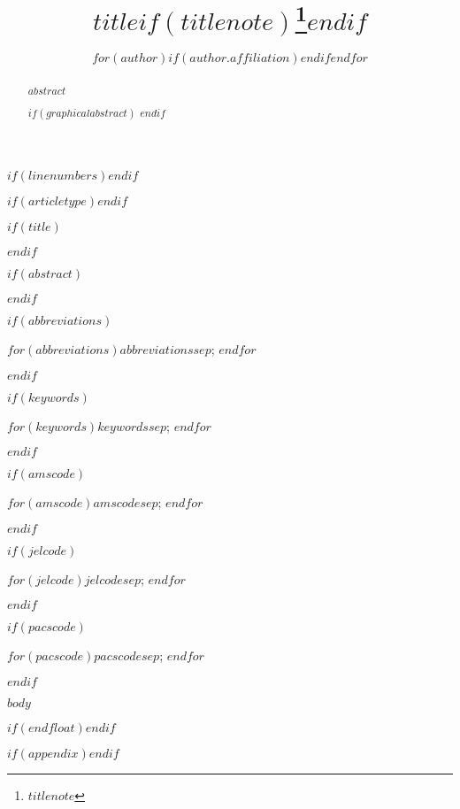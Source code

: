 \documentclass[$for(classoption)$$classoption$$sep$,$endfor$]{$documentclass$}
\theoremstyle{plain}
\theoremstyle{definition}
\theoremstyle{remark}
\begin{document}
$if(linenumbers)$\linenumbers$endif$

$if(articletype)$$endif$

$if(title)$
\title{$title$$if(titlenote)$\thanks{$titlenote$}$endif$}
$endif$

\author{%
$for(author)$$if(author.affiliation)$$endif$$endfor$
}

\maketitle

$if(abstract)$
\begin{abstract}
$abstract$

$if(graphicalabstract)$
$endif$
\end{abstract}
$endif$

$if(abbreviations)$
\begin{abbreviations}
$for(abbreviations)$$abbreviations$$sep$; $endfor$
\end{abbreviations}
$endif$

$if(keywords)$
\begin{keywords}
$for(keywords)$$keywords$$sep$; $endfor$
\end{keywords}
$endif$

$if(amscode)$
\begin{amscode}
$for(amscode)$$amscode$$sep$; $endfor$
\end{amscode}
$endif$

$if(jelcode)$
\begin{jelcode}
$for(jelcode)$$jelcode$$sep$; $endfor$
\end{jelcode}
$endif$

$if(pacscode)$
\begin{pacscode}
$for(pacscode)$$pacscode$$sep$; $endfor$
\end{pacscode}
$endif$

$body$

$if(endfloat)$\processdelayedfloats$endif$

$if(appendix)$\appendix$endif$
\end{document}
